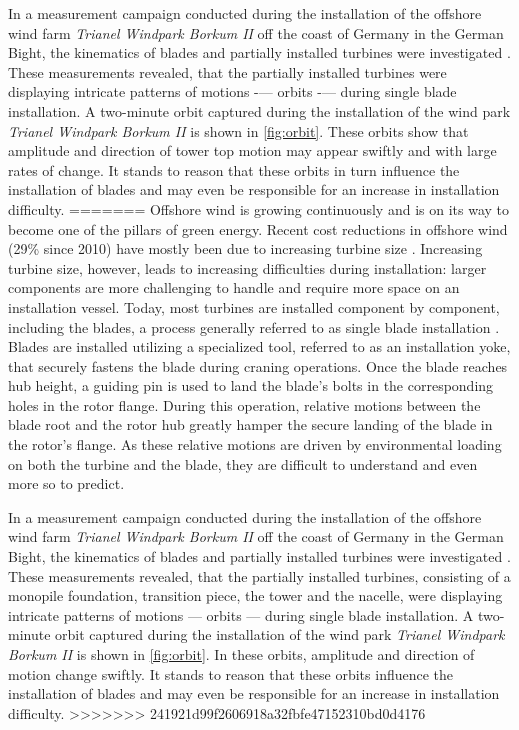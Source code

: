 \documentclass{article}
\begin{document}
In a measurement campaign conducted during the installation of the offshore wind farm \textit{Trianel Windpark Borkum II} off the coast of Germany in the German Bight, the kinematics of blades and partially installed turbines were investigated \citep{sanderRelativeMotionSingle2020,  sanderMONITORINGOFFSHOREWIND2020, sanderOscillationsOffshoreWind2020}. These measurements revealed, that the partially installed turbines were displaying intricate patterns of motions -— orbits -— during single blade installation. A two-minute orbit captured during the installation of the wind park \textit{Trianel Windpark Borkum II} is shown in \autoref{fig:orbit}. These orbits show that amplitude and direction of tower top motion may appear swiftly and with large rates of change. It stands to reason that these orbits in turn influence the installation of blades and may even be responsible for an increase in installation difficulty.
=======
Offshore wind is growing continuously and is on its way to become one of the pillars of green energy. Recent cost reductions in offshore wind (29\% since 2010) have mostly been due to increasing turbine size \citep{irenaRenewablePowerGeneration2020}. Increasing turbine size, however, leads to increasing difficulties during installation: larger components are more challenging to handle and require more space on an installation vessel. Today, most turbines are installed component by component, including the blades, a process generally referred to as single blade installation \citep{jiangInstallationOffshoreWind2021}. Blades are installed utilizing a specialized tool, referred to as an installation yoke, that securely fastens the blade during craning operations. Once the blade reaches hub height, a guiding pin is used to land the blade's bolts in the corresponding holes in the rotor flange. During this operation, relative motions between the blade root and the rotor hub greatly hamper the secure landing of the blade in the rotor's flange. As these relative motions are driven by environmental loading on both the turbine and the blade, they are difficult to understand and even more so to predict. 

In a measurement campaign conducted during the installation of the offshore wind farm \textit{Trianel Windpark Borkum II} off the coast of Germany in the German Bight, the kinematics of blades and partially installed turbines were investigated \citep{sanderRelativeMotionSingle2020,  sanderMONITORINGOFFSHOREWIND2020, sanderOscillationsOffshoreWind2020}. These measurements revealed, that the partially installed turbines, consisting of a monopile foundation, transition piece, the tower and the nacelle, were displaying intricate patterns of motions — orbits — during single blade installation. A two-minute orbit captured during the installation of the wind park \textit{Trianel Windpark Borkum II} is shown in \autoref{fig:orbit}. In these orbits, amplitude and direction of motion change swiftly. It stands to reason that these orbits influence the installation of blades and may even be responsible for an increase in installation difficulty.
>>>>>>> 241921d99f2606918a32fbfe47152310bd0d4176
\end{document}
